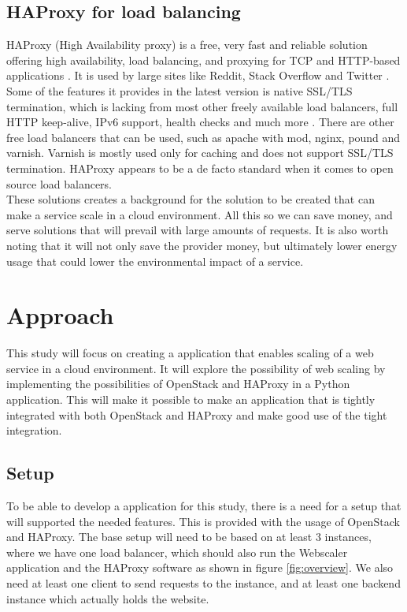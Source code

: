 \subsection{HAProxy for load balancing}
HAProxy (High Availability proxy) is a free, very fast and reliable solution offering
high availability, load balancing, and proxying for TCP and HTTP-based applications
\cite{haproxy:2014}. It is used by large sites like Reddit, Stack Overflow and
Twitter \cite{haproxy:they_use_it}. Some of the features it provides in the
latest version is native SSL/TLS termination, which is lacking from most other
freely available load balancers, full HTTP keep-alive, IPv6 support, health
checks and much more \cite{haproxy:2014}. There are other free load balancers
that can be used, such as apache with mod, nginx, pound and varnish. Varnish is
mostly used only for caching and does not support SSL/TLS termination. HAProxy
appears to be a de facto standard when it comes to open source load
balancers.\\

These solutions creates a background for the solution to be created that can
make a service scale in a cloud environment. All this so we can save money, and
serve solutions that will prevail with large amounts of requests.
It is also worth noting that it will not only save the provider money, but
ultimately lower energy usage that could lower the environmental impact of a
service.



\section{Approach}
This study will focus on creating a application that enables scaling of a web 
service in a cloud environment. It will explore the possibility of web scaling
by implementing the possibilities of OpenStack and HAProxy in a Python
application. 
This will make it possible to make an application that is tightly integrated
with both OpenStack and HAProxy and make good use of the tight integration.

\subsection{Setup}
To be able to develop a application for this study, there is a need for a setup
that will supported the needed features. This is provided with the usage of
OpenStack and HAProxy. The base setup will need to be based on at least 3
instances, where we have one load balancer, which should also run the Webscaler
application and the HAProxy software as shown in figure \ref{fig:overview}. We
also need at least one client to send requests to the instance, and at least
one backend instance which actually holds the website.

